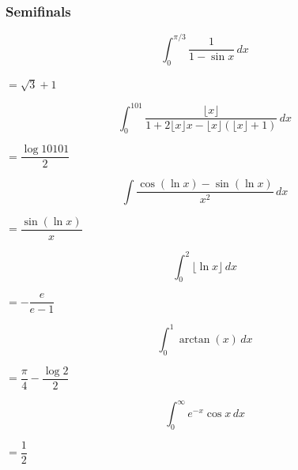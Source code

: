 \subsubsection*{Semifinals}
\begin{questions}

\question \[ \int_0^{\pi/3} \frac{1}{1-\sin x}\, dx \]
\begin{solution} $= \sqrt{3}+1$ \end{solution}

\question \[ \int_0^{101} \frac{\lfloor x\rfloor}{1+2\lfloor x\rfloor x - \lfloor x\rfloor(\lfloor x\rfloor+1)}\, dx \]
\begin{solution} $= \dfrac{\log 10101}{2}$ \end{solution}

\question \[ \int \frac{\cos(\ln x)-\sin(\ln x)}{x^2}\, dx \]
\begin{solution} $= \dfrac{\sin(\ln x)}{x}$ \end{solution}

\question \[ \int_0^2 \lfloor \ln x\rfloor\, dx \]
\begin{solution} $= -\dfrac{e}{e-1}$ \end{solution}

\question[Tiebreaker 1] \[ \int_0^1 \arctan(x)\, dx \]
\begin{solution} $= \dfrac{\pi}{4}-\dfrac{\log 2}{2}$ \end{solution}

\question[Tiebreaker 2] \[ \int_0^\infty e^{-x}\cos x\, dx \]
\begin{solution} $= \dfrac{1}{2}$ \end{solution}

\end{questions}

